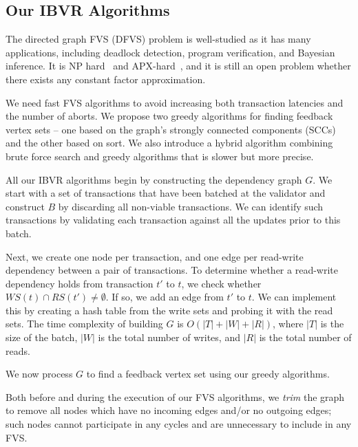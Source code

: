 \subsection{Our IBVR Algorithms}
\label{subsec:validator_reordering:algorithm}

The directed graph FVS (DFVS) problem is well-studied as it has many applications, including deadlock detection, program verification, and Bayesian inference. It is NP hard~\cite{karp1972reducibility} and APX-hard~\cite{kann1992approximability}, and it is still an open problem whether there exists any constant factor approximation.

We need fast FVS algorithms to avoid increasing both transaction latencies and the number of aborts. We propose two greedy algorithms for finding feedback vertex sets -- one based on the graph's strongly connected components (SCCs) and the other based on sort. We also introduce a hybrid algorithm combining brute force search and greedy algorithms that is slower but more precise.

All our IBVR algorithms begin by constructing the dependency graph $G$. We start with a set of transactions that have been batched at the validator and construct $B$ by discarding all non-viable transactions. We can identify such transactions by validating each transaction against all the updates prior to this batch.

Next, we create one node per transaction, and one edge per read-write dependency between a pair of transactions. To determine whether a read-write dependency holds from transaction $t'$ to $t$, we check whether $WS(t) \cap RS(t') \neq \emptyset$. If so, we add an edge from $t'$ to $t$. We can implement this by creating a hash table from the write sets and probing it with the read sets. The time complexity of building $G$ is $O(|T|+|W|+|R|)$, where $|T|$ is the size of the batch, $|W|$ is the total number of writes, and $|R|$ is the total number of reads. 

We now process $G$ to find a feedback vertex set using our greedy algorithms. 

Both before and during the execution of our FVS algorithms, we \emph{trim} the graph to remove all nodes which have no incoming edges and/or no outgoing edges; such nodes cannot participate in any cycles and are unnecessary to include in any FVS.


